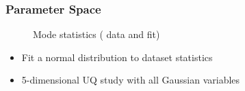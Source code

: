 \documentclass[9pt]{beamer}
\begin{document}
\begin{frame}
\frametitle{Parameter Space}
\label{sec-3-29}

\vspace*{-0.0cm}\begin{figure}
      \caption{Mode statistics ({\color{blue} data} and {\color{red} fit})}
\end{figure}
\begin{itemize}
\item Fit a normal distribution to dataset statistics
\item 5-dimensional UQ study with all Gaussian variables
\end{itemize}
\end{frame}
\end{document}
